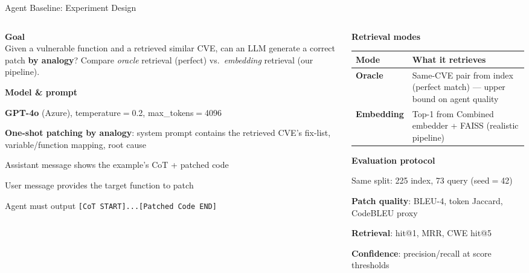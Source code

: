 \documentclass[aspectratio=169,10pt]{beamer}
\begin{document}
\begin{frame}{Agent Baseline: Experiment Design}
\begin{columns}[T]
\begin{column}{0.52\textwidth}

  \textbf{Goal}\\[3pt]
  {\small Given a vulnerable function and a retrieved similar CVE,
  can an LLM generate a correct patch \textbf{by analogy}?
  Compare \textit{oracle} retrieval (perfect) vs.\ \textit{embedding} retrieval (our pipeline).}

  \vspace{0.6em}
  \textbf{Model \& prompt}
  \begin{itemize}\setlength{\itemsep}{2pt}
    {\scriptsize
    \item \textbf{GPT-4o} (Azure), temperature$=$0.2, max\_tokens$=$4096
    \item \textbf{One-shot patching by analogy}: system prompt contains the
          retrieved CVE's fix-list, variable/function mapping, root cause
    \item Assistant message shows the example's CoT + patched code
    \item User message provides the target function to patch
    \item Agent must output \texttt{[CoT START]...[Patched Code END]}}
  \end{itemize}

\end{column}
\begin{column}{0.45\textwidth}

  \textbf{Retrieval modes}

  \vspace{0.3em}
  {\small
  \renewcommand{\arraystretch}{1.2}
  \begin{tabular}{p{1.5cm}p{4.5cm}}
    \toprule
    \textbf{Mode} & \textbf{What it retrieves} \\
    \midrule
    \textbf{Oracle}
      & Same-CVE pair from index (perfect match) — upper bound on agent quality \\
    \textbf{Embedding}
      & Top-1 from Combined embedder + FAISS (realistic pipeline) \\
    \bottomrule
  \end{tabular}}

  \vspace{0.5em}
  \textbf{Evaluation protocol}
  \begin{itemize}\setlength{\itemsep}{1pt}
    {\scriptsize
    \item Same split: 225 index, 73 query (seed$=$42)
    \item \textbf{Patch quality}: BLEU-4, token Jaccard, CodeBLEU proxy
    \item \textbf{Retrieval}: hit@1, MRR, CWE hit@5
    \item \textbf{Confidence}: precision/recall at score thresholds}
  \end{itemize}

\end{column}
\end{columns}
\end{frame}
\end{document}
